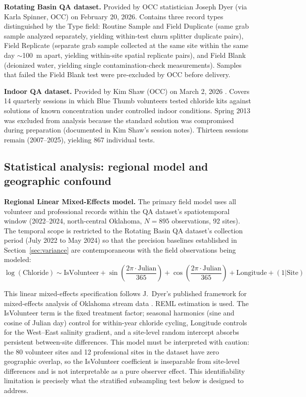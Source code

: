 \documentclass[lineno]{wlpeerj}
\begin{document}
\textbf{Rotating Basin QA dataset.} Provided by OCC statistician Joseph Dyer (via Karla Spinner, OCC) on February 20, 2026. Contains three record types distinguished by the Type field: Routine Sample and Field Duplicate (same grab sample analyzed separately, yielding within-test churn splitter duplicate pairs), Field Replicate (separate grab sample collected at the same site within the same day $\sim$100~m apart, yielding within-site spatial replicate pairs), and Field Blank (deionized water, yielding single contamination-check measurements). Samples that failed the Field Blank test were pre-excluded by OCC before delivery.

\textbf{Indoor QA dataset.} Provided by Kim Shaw (OCC) on March 2, 2026 \citep{Shaw2026}. Covers 14 quarterly sessions in which Blue Thumb volunteers tested chloride kits against solutions of known concentration under controlled indoor conditions. Spring 2013 was excluded from analysis because the standard solution was compromised during preparation (documented in Kim Shaw's session notes). Thirteen sessions remain (2007--2025), yielding 867 individual tests.

\subsection{Statistical analysis: regional model and geographic confound}

\textbf{Regional Linear Mixed-Effects model.} The primary field model uses all volunteer and professional records within the QA dataset's spatiotemporal window (2022--2024, north-central Oklahoma, $N=895$ observations, 92 sites). The temporal scope is restricted to the Rotating Basin QA dataset's collection period (July 2022 to May 2024) so that the precision baselines established in Section~\ref{sec:variance} are contemporaneous with the field observations being modeled:
\begin{equation}
\log(\mathrm{Chloride}) \sim \mathrm{IsVolunteer} + \sin\!\left(\frac{2\pi \cdot \mathrm{Julian}}{365}\right) + \cos\!\left(\frac{2\pi \cdot \mathrm{Julian}}{365}\right) + \mathrm{Longitude} + (1|\mathrm{Site})
\label{eq:regionallme}
\end{equation}

This linear mixed-effects specification \citep{Pinheiro2000, Zuur2009, Bolker2009} follows J.\ Dyer's published framework for mixed-effects analysis of Oklahoma stream data \citep{Dyer2025}. REML estimation is used. The IsVolunteer term is the fixed treatment factor; seasonal harmonics (sine and cosine of Julian day) control for within-year chloride cycling, Longitude controls for the West--East salinity gradient, and a site-level random intercept absorbs persistent between-site differences. This model must be interpreted with caution: the 80 volunteer sites and 12 professional sites in the dataset have zero geographic overlap, so the IsVolunteer coefficient is inseparable from site-level differences and is not interpretable as a pure observer effect. This identifiability limitation is precisely what the stratified subsampling test below is designed to address.
\end{document}
